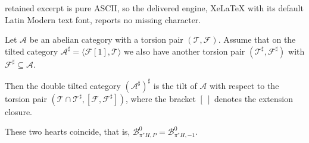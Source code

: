 \documentclass[10pt,a4paper]{amsart}
\begin{document}
retained excerpt is pure ASCII, so the delivered engine, XeLaTeX with its default Latin Modern text font, reports no missing character.
\begin{lemma}\label{doubletilt}
Let $\mathcal{A}$ be an abelian category  with a torsion pair $(\mathcal{T},\mathcal{F})$.
Assume that on the tilted category $\mathcal{A}^\sharp = \langle \mathcal{F}[1],\mathcal{T}\rangle$ we also have another torsion pair $(\mathcal{T}^\sharp,\mathcal{F}^\sharp)$ with $\mathcal{F}^\sharp \subseteq \mathcal{A}$.

Then the double tilted category $(\mathcal{A}^\sharp)^\sharp$ is the tilt of $\mathcal{A}$ with respect to the torsion pair $(\mathcal{T}\cap \mathcal{T}^\sharp,  [\mathcal{F}, \mathcal{F}^\sharp])$, where the bracket $[ \ ]$ denotes the extension closure.
\end{lemma}

\begin{proposition}\label{B0}
These two hearts coincide, that is, $\mathcal{B}^0_{\pi^\ast H,P}= \mathcal{B}^0_{\pi^\ast H,-1}$. 
\end{proposition}
\end{document}
